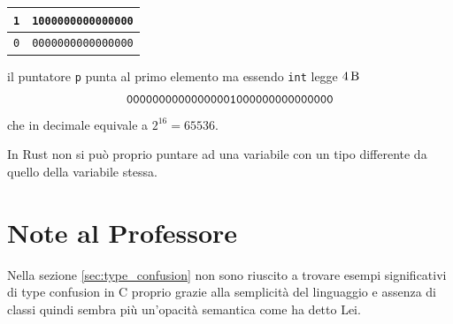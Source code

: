 \documentclass{report}
\begin{document}
\begin{table}[H]
	\label{fig:mem_type_stack}
	\centering
	\begin{tabular}{|c|c|}
		\hline
		\texttt{1} & \texttt{1000000000000000} \\
		\hline 
		\texttt{0} & \texttt{0000000000000000} \\
		\hline
	\end{tabular}
\end{table}

il puntatore \texttt{p} punta al primo elemento ma essendo \texttt{int} legge $\SI{4}{\byte}$  
\[
\texttt{00000000000000001000000000000000} \\
\]
che in decimale equivale a $ 2^{16} = 65536 $.




In Rust non si può proprio puntare ad una variabile con un tipo differente da quello della variabile stessa.




\chapter{Note al Professore}
Nella sezione \ref{sec:type_confusion} non sono riuscito a trovare esempi significativi di type confusion in C proprio grazie alla semplicità del linguaggio e assenza di classi quindi sembra più un'opacità semantica come ha detto Lei.

\clearpage
%

{}
\end{document}
